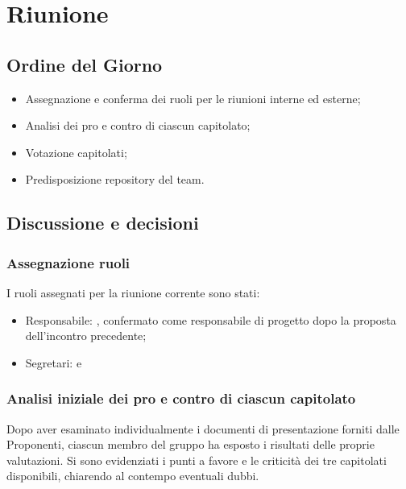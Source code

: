 \section{Riunione}
\subsection{Ordine del Giorno}
\begin{itemize}
	\item Assegnazione e conferma dei ruoli per le riunioni interne ed esterne;
	\item Analisi dei pro e contro di ciascun capitolato;
	\item Votazione capitolati;
	\item Predisposizione repository del team.
\end{itemize}

\subsection{Discussione e decisioni}

\subsubsection{Assegnazione ruoli}
I ruoli assegnati per la riunione corrente sono stati:
\begin{itemize}
	\item Responsabile: \sebastiano, confermato come responsabile di progetto dopo la proposta dell’incontro precedente;
	\item Segretari: \tommaso{} e \raul
\end{itemize}

\subsubsection{Analisi iniziale dei pro e contro di ciascun capitolato}
Dopo aver esaminato individualmente i documenti di presentazione forniti dalle Proponenti, ciascun membro del gruppo ha esposto i risultati delle proprie valutazioni. Si sono evidenziati i punti a favore e le criticità dei tre capitolati disponibili, chiarendo al contempo eventuali dubbi.

